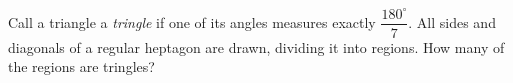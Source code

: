 Call a triangle a \emph{tringle} if one of its angles measures exactly $\dfrac{180^\circ}{7}$. All sides and diagonals of a regular heptagon are drawn, dividing it into regions. How many of the regions are tringles?
